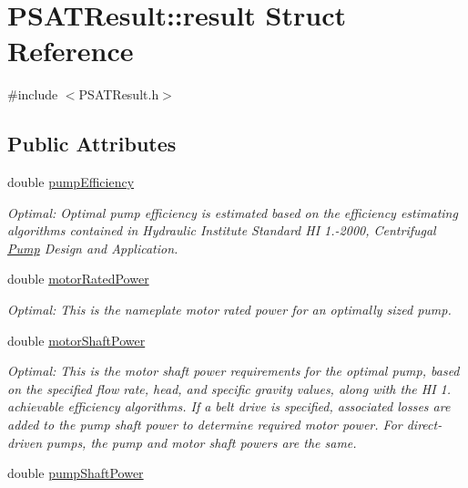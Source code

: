 \hypertarget{struct_p_s_a_t_result_1_1result}{}\section{P\+S\+A\+T\+Result\+:\+:result Struct Reference}
\label{struct_p_s_a_t_result_1_1result}


{\ttfamily \#include $<$P\+S\+A\+T\+Result.\+h$>$}

\subsection*{Public Attributes}
\begin{DoxyCompactItemize}
\item 
double \hyperlink{struct_p_s_a_t_result_1_1result_ab3658ff7a740a5b846b216e9efab0f6f}{pump\+Efficiency}
\begin{DoxyCompactList}\small\item\em Optimal\+: Optimal pump efficiency is estimated based on the efficiency estimating algorithms contained in Hydraulic Institute Standard HI 1.-\/2000, Centrifugal \hyperlink{class_pump}{Pump} Design and Application. \end{DoxyCompactList}\item 
double \hyperlink{struct_p_s_a_t_result_1_1result_acee4fa628de4b65c6fcd58d22432244a}{motor\+Rated\+Power}
\begin{DoxyCompactList}\small\item\em Optimal\+: This is the nameplate motor rated power for an optimally sized pump. \end{DoxyCompactList}\item 
double \hyperlink{struct_p_s_a_t_result_1_1result_a8050ab06ea7a603ad5e5db66e6456c7f}{motor\+Shaft\+Power}
\begin{DoxyCompactList}\small\item\em Optimal\+: This is the motor shaft power requirements for the optimal pump, based on the specified flow rate, head, and specific gravity values, along with the HI 1. achievable efficiency algorithms. If a belt drive is specified, associated losses are added to the pump shaft power to determine required motor power. For direct-\/driven pumps, the pump and motor shaft powers are the same. \end{DoxyCompactList}\item 
double \hyperlink{struct_p_s_a_t_result_1_1result_ae0b7e90c8f6e8ba8afc1b85c11fcedff}{pump\+Shaft\+Power}

\end{DoxyCompactItemize}
